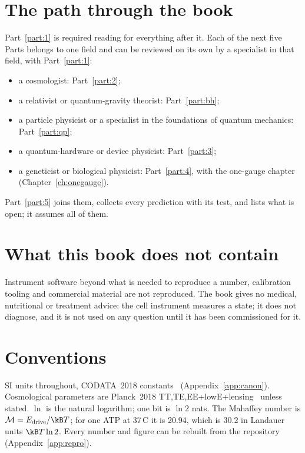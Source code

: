 \section*{The path through the book}
Part~\ref{part:1} is required reading for everything after it. Each of the next five Parts belongs to one field and can be reviewed on its own
by a specialist in that field, with Part~\ref{part:1}:
\begin{itemize}\itemsep0pt
\item a cosmologist: Part~\ref{part:2};
\item a relativist or quantum-gravity theorist: Part~\ref{part:bh};
\item a particle physicist or a specialist in the foundations of quantum mechanics: Part~\ref{part:qp};
\item a quantum-hardware or device physicist: Part~\ref{part:3};
\item a geneticist or biological physicist: Part~\ref{part:4}, with the one-gauge chapter (Chapter~\ref{ch:onegauge}).
\end{itemize}
Part~\ref{part:5} joins them, collects every prediction with its test, and lists what is open; it assumes all of them.

\section*{What this book does not contain}
Instrument software beyond what is needed to reproduce a number, calibration tooling and commercial material are not reproduced. The book gives no
medical, nutritional or treatment advice: the cell instrument measures a state; it does not diagnose, and it is not used on any question until it
has been commissioned for it.

\section*{Conventions}
SI units throughout, CODATA~2018 constants~\cite{CODATA2018} (Appendix~\ref{app:canon}). Cosmological parameters are Planck~2018
TT,TE,EE+lowE+lensing~\cite{Planck2018VI} unless stated. $\ln$ is the natural logarithm; one bit is $\ln2$ nats. The Mahaffey number is
$\mathcal M=E_{\rm drive}/\kB T$; for one ATP at 37\,\textdegree C it is 20.94, which is 30.2 in Landauer units $\kB T\ln2$. Every number and figure
can be rebuilt from the repository (Appendix~\ref{app:repro}).
